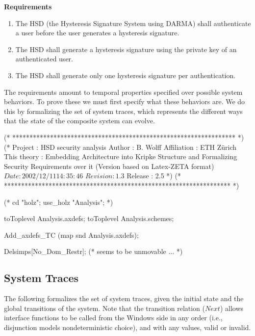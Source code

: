\documentclass[a4paper,pdftex]{article}
\newenvironment{holz-ml}{\comment}{\endcomment}
\begin{document}
\textbf{Requirements}
\begin{enumerate}
\item The HSD (the Hysteresis Signature System using DARMA) shall
  authenticate a user before the user generates a hysteresis
  signature.
\item The HSD shall generate a hysteresis signature using the private
  key of an authenticated user.
\item The HSD shall generate only one hysteresis signature per
  authentication. 
\end{enumerate}

The requirements amount to temporal properties specified over
possible system behaviors.  To prove these we must first specify
what these behaviors are.  We do this by formalizing the set
of system traces, which represents the different ways that the state
of the composite system can evolve.

\begin{holz-ml}

(* ***************************************************************** *)
(*      Project         : HSD security analysis
        Author          : B. Wolff
        Affiliation     : ETH Z\"urich
        This theory     : Embedding Architecture into Kripke
                          Structure and Formalizing Security Requirements
                          over it 
                          (Version based on Latex-ZETA format)
        $Date: 2002/12/11 14:35:46 $
        $Revision: 1.3 $
        Release         : 2.5                                         *)
(* ****************************************************************** *)

(* cd "holz"; 
   use_holz "Analysis";
 *)

toToplevel Analysis.axdefs;
toToplevel Analysis.schemes;

Add_axdefs_TC (map snd Analysis.axdefs);

Delsimps[No_Dom_Restr]; (* seems to be unmovable ... *)

\end{holz-ml}


\subsection{System Traces} \label{traces-sec}

The following formalizes the set of system traces, given the
initial state and the global transitions of the system.
Note that the transition relation ($Next$) allows interface
functions to be called from the Windows side in any order
 (i.e., disjunction models nondeterministic choice),
and with any values, valid or invalid.
\end{document}
